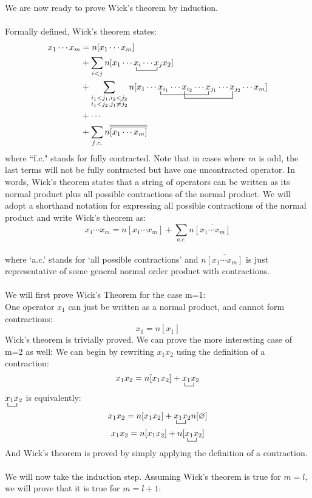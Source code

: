 \documentclass{article}
\newcommand{\ol}{\overline}
\newcommand{\ctr}{\bcontraction}
\newcommand{\cd}{\ensuremath{\cdots} }
\begin{document}
We are now ready to prove Wick's theorem by induction. \\ \\
Formally defined, Wick's theorem states: 
\begin{align*}
x_1 \cd x_m &= n[x_1 \cd x_m ]  \\
&+ \sum_{i < j} \ctr{n[x_1 \cd}{x}{{}_i \cd }{x} n[x_1 \cd x_i \cd x_j x_2] \\
&+ \sum_{\substack{i_1 < j_1,  i_2 < j_2 \\ i_1 < j_2, j_1 \neq j_2}} 
\ctr{n[x_1 \cd}{x}{{}_{i_1} \cd x_{i_2} \cd}{x}
\ctr[2ex]{n[x_1 \cd x_{i_1} \cd }{x}{{}_{i_2} \cd x_{j_1} \cd}{x}
n[x_1 \cd x_{i_1} \cd x_{i_2} \cd x_{j_1} \cd x_{j_2} \cd x_m ]  \\
&+ \cd \\
&+ \sum_{f.c.} n \ol{\ol{[x_1 \cd x_m]  }}
\end{align*}
where ``f.c." stands for fully contracted. 
Note that in cases where $m$ is odd, the last terms will not be fully contracted but have one uncontracted operator. 
In words, Wick's theorem states that a string of operators can be written as its normal product plus all possible contractions of the normal product. 
We will adopt a shorthand notation for expressing all possible contractions of the normal product and write Wick's theorem as: 
\[x_1 \cd x_m = n[x_1 \cd x_m ]  + \sum_{a.c.} n\ol{[x_1 \cd x_m ]} \]\\
where `a.c.' stands for `all possible contractions' and $n\ol{[x_1 \cd x_m ]}$ is just representative of some general normal order product with contractions. 
\\ \\
We will first prove Wick's Theorem for the case m=1: 
\\
One operator $x_1$ can just be written as a normal product, and cannot form contractions:
\[x_1 = n[x_1] \]
Wick's theorem is trivially proved. 
We can prove the more interesting case of m=2 as well: 
We can begin by rewriting $x_1x_2$ using the definition of a contraction:
\[x_1x_2 = n[x_1x_2] + \ctr{}{x}{{}_1}{x} x_1 x_2\]
$\ctr{}{x}{{}_1}{x} x_1 x_2$ is equivalently: 
\[x_1x_2 = n[x_1x_2] + \ctr{}{x}{{}_1}{x} x_1 x_2 n[\varnothing]\]
\[ x_1x_2   = n[x_1x_2] + n[ \ctr{}{x}{{}_1}{x} x_1 x_2] \]
And Wick's theorem is proved by simply applying the definition of a contraction.  \\ \\
We will now take the induction step. Assuming Wick's theorem is true for $m=l$, we will prove that it is true for $m=l+1$: 
\end{document}
